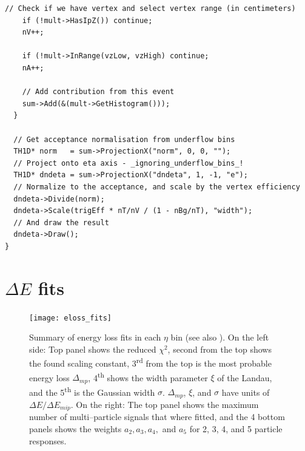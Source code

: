 \documentclass[11pt]{article}
\begin{document}
\begin{lstlisting}[caption={Example 2\textsuperscript{nd} pass code to
    do $\dndeta$},label={lst:example},frame=single,captionpos=b]
    // Check if we have vertex and select vertex range (in centimeters) 
    if (!mult->HasIpZ()) continue;
    nV++;
    
    if (!mult->InRange(vzLow, vzHigh) continue; 
    nA++;

    // Add contribution from this event
    sum->Add(&(mult->GetHistogram()));
  }

  // Get acceptance normalisation from underflow bins 
  TH1D* norm   = sum->ProjectionX("norm", 0, 0, "");
  // Project onto eta axis - _ignoring_underflow_bins_!
  TH1D* dndeta = sum->ProjectionX("dndeta", 1, -1, "e");
  // Normalize to the acceptance, and scale by the vertex efficiency 
  dndeta->Divide(norm);
  dndeta->Scale(trigEff * nT/nV / (1 - nBg/nT), "width");
  // And draw the result
  dndeta->Draw();
}
\end{lstlisting}

\section{$\Delta E$ fits} 
\label{app:eloss_fits}

\begin{figure}[htbp]
  \centering
  \texttt{[image: eloss\_fits]}
  \caption{Summary of energy loss fits in each $\eta$ bin (see also
    ).
    \newline
    On the left side: Top panel shows the
    reduced $\chi^2$, second from the top shows the found
    scaling constant, 3\textsuperscript{rd} from the top is
    the most probable energy loss $\Delta_{mp}$, 4\textsuperscript{th}
    shows the width parameter $\xi$ of the Landau, and the
    5\textsuperscript{th} is the Gaussian width $\sigma$.
    $\Delta_{mp}$, $\xi$, and $\sigma$ have units of $\Delta E/\Delta
    E_{mip}$. 
    \newline
    On the right: The top panel shows the maximum number of
    multi--particle signals that where fitted, and the 4 bottom panels
    shows the weights $a_2,a_3,a_4,$ and $a_5$ for 2, 3, 4, and 5
    particle responses.}
  \label{fig:eloss_fits}
\end{figure}
\end{document}
